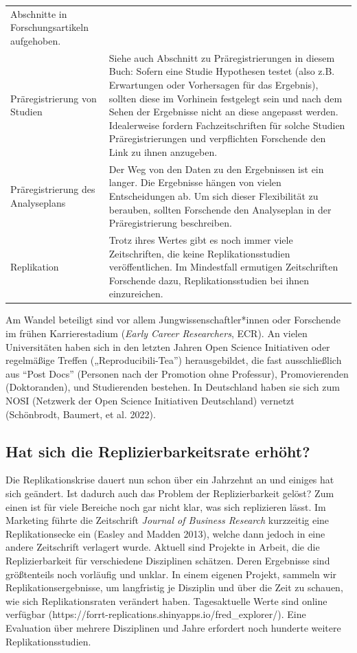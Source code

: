 \documentclass[
  letterpaper,
  DIV=11,
  numbers=noendperiod]{scrreprt}
\begin{document}
\begin{longtable}[]{@{}
  >{\raggedright\arraybackslash}p{}
  >{\raggedright\arraybackslash}p{}@{}}
Abschnitte in Forschungsartikeln aufgehoben. \\
Präregistrierung von Studien & Siehe auch Abschnitt zu
Präregistrierungen in diesem Buch: Sofern eine Studie Hypothesen testet
(also z.B. Erwartungen oder Vorhersagen für das Ergebnis), sollten diese
im Vorhinein festgelegt sein und nach dem Sehen der Ergebnisse nicht an
diese angepasst werden. Idealerweise fordern Fachzeitschriften für
solche Studien Präregistrierungen und verpflichten Forschende den Link
zu ihnen anzugeben. \\
Präregistrierung des Analyseplans & Der Weg von den Daten zu den
Ergebnissen ist ein langer. Die Ergebnisse hängen von vielen
Entscheidungen ab. Um sich dieser Flexibilität zu berauben, sollten
Forschende den Analyseplan in der Präregistrierung beschreiben. \\
Replikation & Trotz ihres Wertes gibt es noch immer viele Zeitschriften,
die keine Replikationsstudien veröffentlichen. Im Mindestfall ermutigen
Zeitschriften Forschende dazu, Replikationsstudien bei ihnen
einzureichen. \\
\end{longtable}

Am Wandel beteiligt sind vor allem Jungwissenschaftler*innen oder
Forschende im frühen Karrierestadium (\emph{Early Career Researchers},
ECR). An vielen Universitäten haben sich in den letzten Jahren Open
Science Initiativen oder regelmäßige Treffen („Reproducibili-Tea'')
herausgebildet, die fast ausschließlich aus ``Post Docs'' (Personen nach
der Promotion ohne Professur), Promovierenden (Doktoranden), und
Studierenden bestehen. In Deutschland haben sie sich zum NOSI (Netzwerk
der Open Science Initiativen Deutschland) vernetzt (Schönbrodt, Baumert,
et al. 2022).

\subsection{Hat sich die Replizierbarkeitsrate
erhöht?}\label{hat-sich-die-replizierbarkeitsrate-erhuxf6ht}

Die Replikationskrise dauert nun schon über ein Jahrzehnt an und einiges
hat sich geändert. Ist dadurch auch das Problem der Replizierbarkeit
gelöst? Zum einen ist für viele Bereiche noch gar nicht klar, was sich
replizieren lässt. Im Marketing führte die Zeitschrift \emph{Journal of
Business Research} kurzzeitig eine Replikationsecke ein (Easley and
Madden 2013), welche dann jedoch in eine andere Zeitschrift verlagert
wurde. Aktuell sind Projekte in Arbeit, die die Replizierbarkeit für
verschiedene Disziplinen schätzen. Deren Ergebnisse sind größtenteils
noch vorläufig und unklar. In einem eigenen Projekt, sammeln wir
Replikationsergebnisse, um langfristig je Disziplin und über die Zeit zu
schauen, wie sich Replikationsraten verändert haben. Tagesaktuelle Werte
sind online verfügbar
(https://forrt-replications.shinyapps.io/fred\_explorer/). Eine
Evaluation über mehrere Disziplinen und Jahre erfordert noch hunderte
weitere Replikationsstudien.
\end{document}
